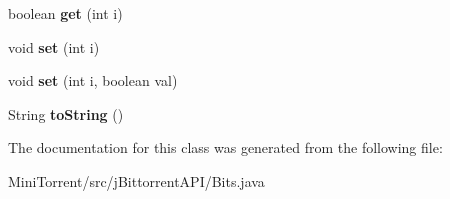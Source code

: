 \begin{DoxyCompactItemize}
\item 
\hypertarget{classj_bittorrent_a_p_i_1_1_bits_a07b0949ea07a5d2e00289bac61d8183e}{
boolean {\bfseries get} (int i)}
\label{classj_bittorrent_a_p_i_1_1_bits_a07b0949ea07a5d2e00289bac61d8183e}

\item 
\hypertarget{classj_bittorrent_a_p_i_1_1_bits_a5e4fca06bc243d9481fe0f361c83561d}{
void {\bfseries set} (int i)}
\label{classj_bittorrent_a_p_i_1_1_bits_a5e4fca06bc243d9481fe0f361c83561d}

\item 
\hypertarget{classj_bittorrent_a_p_i_1_1_bits_a610449a0a9552f99ff26bc06345f0734}{
void {\bfseries set} (int i, boolean val)}
\label{classj_bittorrent_a_p_i_1_1_bits_a610449a0a9552f99ff26bc06345f0734}

\item 
\hypertarget{classj_bittorrent_a_p_i_1_1_bits_ace05a43aee576d40e3fe80be6b812424}{
String {\bfseries toString} ()}
\label{classj_bittorrent_a_p_i_1_1_bits_ace05a43aee576d40e3fe80be6b812424}

\end{DoxyCompactItemize}


The documentation for this class was generated from the following file:\begin{DoxyCompactItemize}
\item 
MiniTorrent/src/jBittorrentAPI/Bits.java\end{DoxyCompactItemize}

